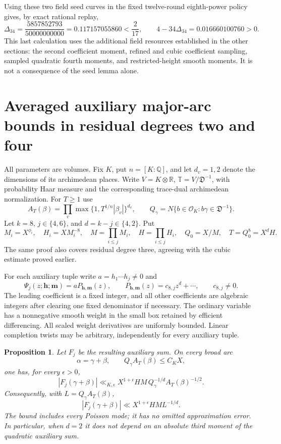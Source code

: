 \documentclass[11pt,reqno]{amsart}
\numberwithin{equation}{section}
\newtheorem{proposition}[theorem]{Proposition}
\theoremstyle{definition}
\begin{document}
Using these two field seed curves in the fixed twelve-round eighth-power
policy gives, by exact rational replay,
\[
 \Delta_{34}=\frac{5857852793}{50000000000}
              =0.117157055860<\frac2{17},
 \qquad
 4-34\Delta_{34}=0.016660100760>0.
\]
This last calculation uses the additional field resources established in
the other sections: the second coefficient moment, refined and cubic
coefficient sampling, sampled quadratic fourth moments, and restricted-height
smooth moments. It is not a consequence of the seed lemma alone.


\section{Averaged auxiliary major-arc bounds in residual degrees two and four}
\label{sec:aux-major-24}

All parameters are volumes.  Fix $K$, put $n=[K:\mathbb Q]$, and let
$d_v=1,2$ denote the dimensions of its archimedean places.  Write
$V=K\otimes\mathbb R$, $\mathbb T=V/\mathfrak D^{-1}$, with probability
Haar measure and the corresponding trace-dual archimedean normalization.
For $T\ge1$ use
\[
 A_T(\beta)=\prod_v\max\{1,T^{1/n}|\beta_v|\}^{d_v},\qquad
 Q_\gamma=N\{b\in\mathcal O_K:b\gamma\in\mathfrak D^{-1}\}.
\]
Let $k=8$, $j\in\{4,6\}$, and $d=k-j\in\{4,2\}$.  Put
\[
 M_i=X^{\phi_i},\quad H_i=XM_i^{-8},\quad
 M=\prod_{i\le j}M_i,\quad H=\prod_{i\le j}H_i,\quad
 Q_0=X/M,\quad T=Q_0^8=X^dH.
\]
The same proof also covers residual degree three, agreeing with the cubic
estimate proved earlier.

For each auxiliary tuple write $a=h_1\cdots h_j\ne0$ and
\[
 \Psi_j(z;\mathbf h;\mathbf m)=aP_{\mathbf h,\mathbf m}(z),
 \qquad P_{\mathbf h,\mathbf m}(z)=c_{8,j}z^d+\cdots,
 \qquad c_{8,j}\ne0.
\]
The leading coefficient is a fixed integer, and all other coefficients
are algebraic integers after clearing one fixed denominator if necessary.
The ordinary variable has a nonnegative smooth weight in the small box
retained by efficient differencing.  All scaled weight derivatives are
uniformly bounded.  Linear completion twists may be arbitrary, independently
for every auxiliary tuple.

\begin{proposition}\label{prop:aux-major-24}
Let $F_j$ be the resulting auxiliary sum.  On every broad arc
\[
 \alpha=\gamma+\beta,\qquad Q_\gamma A_T(\beta)\le C_KX,
\]
one has, for every $\epsilon>0$,
\begin{equation}\label{eq:aux-major-strong}
 |F_j(\gamma+\beta)|
 \ll_{K,\epsilon}X^{1+\epsilon}HM\,
            Q_\gamma^{-1/d}A_T(\beta)^{-1/2}.
\end{equation}
Consequently, with $L=Q_\gamma A_T(\beta)$,
\begin{equation}\label{eq:aux-major-height}
 |F_j(\gamma+\beta)|\ll X^{1+\epsilon}HM L^{-1/d}.
\end{equation}
The bound includes every Poisson mode; it has no omitted approximation
error.  In particular, when $d=2$ it does not depend on an absolute third
moment of the quadratic auxiliary sum.
\end{proposition}
\end{document}
